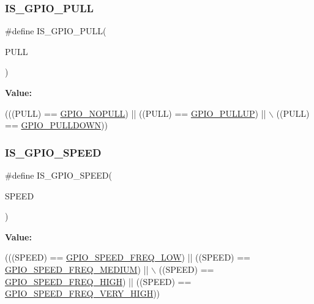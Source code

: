 \subsubsection{\texorpdfstring{I\+S\+\_\+\+G\+P\+I\+O\+\_\+\+P\+U\+LL}{IS\_GPIO\_PULL}}
{\footnotesize\ttfamily \#define I\+S\+\_\+\+G\+P\+I\+O\+\_\+\+P\+U\+LL(\begin{DoxyParamCaption}\item[{}]{P\+U\+LL }\end{DoxyParamCaption})}

{\bfseries Value\+:}
\begin{DoxyCode}
(((PULL) == \hyperlink{group___g_p_i_o__pull__define_ga5c2862579882c1cc64e36d38fbd07a4c}{GPIO\_NOPULL}) || ((PULL) == \hyperlink{group___g_p_i_o__pull__define_gae689bc8f5c42d6df7bd54a8dd372e072}{GPIO\_PULLUP}) || \(\backslash\)
                            ((PULL) == \hyperlink{group___g_p_i_o__pull__define_ga75d958d0410c36da7f27d1f4f5c36c14}{GPIO\_PULLDOWN}))
\end{DoxyCode}
\mbox{\label{group___g_p_i_o___private___macros_ga888e1f951df2fe9dbf827528051a3a56}} 
\subsubsection{\texorpdfstring{I\+S\+\_\+\+G\+P\+I\+O\+\_\+\+S\+P\+E\+ED}{IS\_GPIO\_SPEED}}
{\footnotesize\ttfamily \#define I\+S\+\_\+\+G\+P\+I\+O\+\_\+\+S\+P\+E\+ED(\begin{DoxyParamCaption}\item[{}]{S\+P\+E\+ED }\end{DoxyParamCaption})}

{\bfseries Value\+:}
\begin{DoxyCode}
(((SPEED) == \hyperlink{group___g_p_i_o__speed__define_gab7916c4265bfa1b26a5205ea9c1caa4e}{GPIO\_SPEED\_FREQ\_LOW})  || ((SPEED) == 
      \hyperlink{group___g_p_i_o__speed__define_ga1724a25a9cf00ebf485daeb09cfa1e25}{GPIO\_SPEED\_FREQ\_MEDIUM}) || \(\backslash\)
                              ((SPEED) == \hyperlink{group___g_p_i_o__speed__define_gaef5898db71cdb957cd41f940b0087af8}{GPIO\_SPEED\_FREQ\_HIGH}) || ((SPEED) == 
      \hyperlink{group___g_p_i_o__speed__define_ga1944cf10e2ab172810d38b681d40b771}{GPIO\_SPEED\_FREQ\_VERY\_HIGH}))
\end{DoxyCode}
